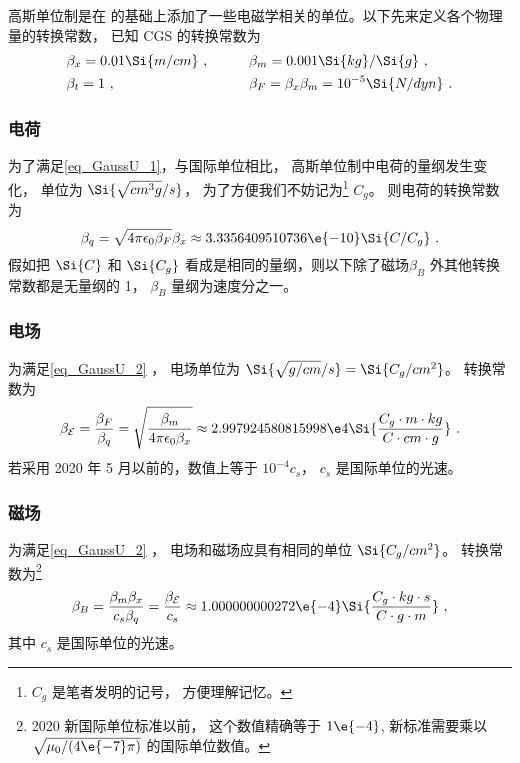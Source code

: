 

高斯单位制是在 的基础上添加了一些电磁学相关的单位。以下先来定义各个物理量的转换常数， 
已知 CGS 的转换常数为
\begin{equation}\label{eq_GaussU_3}
\begin{aligned}
&\beta_x = 0.01\Si{m/cm} ~,&\qquad &\beta_m = 0.001\Si{kg}/\Si{g}~,\\
&\beta_t = 1 ~,&\qquad  &\beta_F = \beta_x \beta_m = 10^{-5}\Si{N/dyn}~.
\end{aligned}
\end{equation}

\subsubsection{电荷}
为了满足\autoref{eq_GaussU_1}，与国际单位相比， 高斯单位制中电荷的量纲发生变化， 单位为 $\Si{\sqrt{cm^3 g}/s}$， 为了方便我们不妨记为\footnote{$C_g$ 是笔者发明的记号， 方便理解记忆。} $C_g$。 则电荷的转换常数为
\begin{equation}
\beta_q = \sqrt{4\pi\epsilon_0\beta_F} \beta_x \approx 3.3356409510736\e{-10} \Si{C/C_g}~.
\end{equation}
假如把 $\Si{C}$ 和 $\Si{C_g}$ 看成是相同的量纲，则以下除了磁场$\beta_B$ 外其他转换常数都是无量纲的 1， $\beta_B$ 量纲为速度分之一。

\subsubsection{电场}
为满足\autoref{eq_GaussU_2} ， 电场单位为 $\Si{\sqrt{g/cm}/s} = \Si{C_g/cm^2}$。 转换常数为
\begin{equation}
\beta_{\mathcal E} = \frac{\beta_F}{\beta_q} = \sqrt{\frac{\beta_m}{4\pi\epsilon_0 \beta_x}} \approx 2.997924580815998\e4 \Si{\frac{C_g\cdot m\cdot kg}{C\cdot cm\cdot g}}~.
\end{equation}
若采用 2020 年 5 月以前的，数值上等于 $10^{-4} c_{s}$， $c_{s}$ 是国际单位的光速。

\subsubsection{磁场}
为满足\autoref{eq_GaussU_2} ， 电场和磁场应具有相同的单位 $\Si{C_g/cm^2}$。 转换常数为\footnote{2020 新国际单位标准以前， 这个数值精确等于 $1\e{-4}$, 新标准需要乘以 $\sqrt{\mu_0/(4\e{-7}\pi)}$ 的国际单位数值。}
\begin{equation}
\beta_B = \frac{\beta_m\beta_x}{c_s\beta_q} = \frac{\beta_{\mathcal E}}{c_s} \approx 1.000000000272\e{-4} \Si{\frac{C_g\cdot kg \cdot s}{C \cdot g \cdot m}}~,
\end{equation}
其中 $c_{s}$ 是国际单位的光速。

